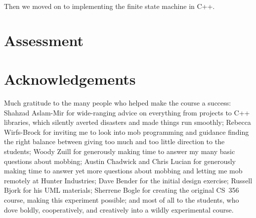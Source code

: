 \documentclass{article}
\begin{document}
Then we moved on to implementing the finite state machine in C++.


\begin{comment}
Semester overview (put this in a small table).

Link to the complete syllabus.

``Software design'' is a highly ambiguous term. 

``common knowledge''

In an ordinary class, I would have demo'ed how to implement the finite state
machine, projecting my computer's screen to the whole class. Instead, we did
our first mob programming.

The day I improvised a lecture on agile vs. waterfall. Previous exposure had
given some students the impression that agile is hopelessly high-risk
because it has no discipline and other
students the impression that waterfall is hopelessly high-risk because it's
inflexible and assumes perfect forethought.

Some students had previous experience with Git and some did not.

No textbooks.

Hard to teach, easy to teach.

Danger: what if a prima donna shows up?

Finding a room

Problems: Not enough mobbing hours in the semester. A true community of
practice would meet nearly every day.
\end{comment}

\section{Assessment}

\section{Acknowledgements}

Much gratitude to the many people who helped make the course a success:
Shahzad Aslam-Mir for wide-ranging advice on everything from projects to C++
libraries, which silently
averted disasters and made things run smoothly;
Rebecca Wirfs-Brock for inviting me to look into mob programming and guidance
finding the right balance between giving too much and too little direction
to the students;
Woody Zuill for generously making time to answer my many basic questions
about mobbing;
Austin Chadwick and Chris Lucian for generously making time to answer yet more
questions about mobbing and letting me mob remotely at Hunter Industries;
Dave Bender for the initial design exercise;
Russell Bjork for his UML materials;
Sherrene Bogle for creating the original CS~356 course, making this experiment
possible;
and most of all to the students, who dove boldly, cooperatively, and
creatively into a wildly experimental course.
\end{document}
